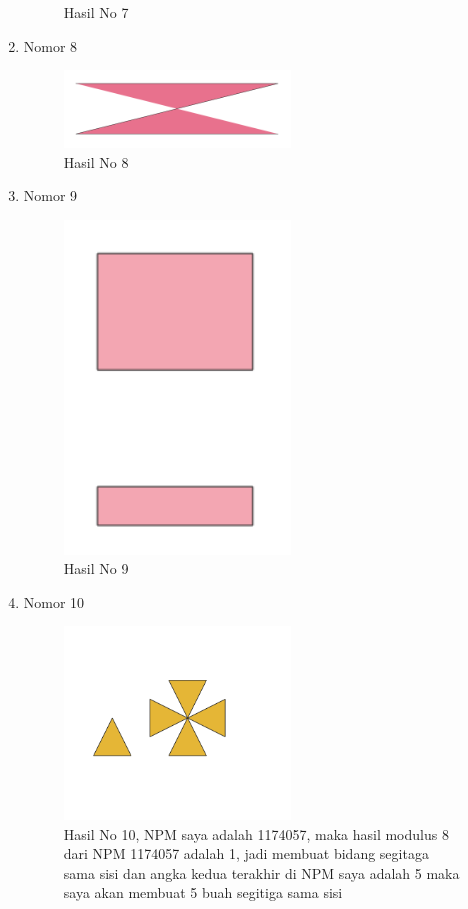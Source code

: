 \begin{enumerate}
\begin{figure}[H]
		\centering
		\caption{Hasil No 7}
	\end{figure}
	\item Nomor 8
	
	\begin{figure}[H]
		\includegraphics[width=6cm]{figures/1174057/alit8.PNG}
		\centering
		\caption{Hasil No 8}
	\end{figure}
	\item Nomor 9
	
	\begin{figure}[H]
		\includegraphics[width=6cm]{figures/1174057/alit9.PNG}
		\centering
		\caption{Hasil No 9}
	\end{figure}
	\item Nomor 10
	
	\begin{figure}[H]
		\includegraphics[width=6cm]{figures/1174057/soal10.PNG}
		\centering
		\caption{Hasil No 10, NPM saya adalah 1174057, maka hasil modulus 8 dari NPM 1174057 adalah 1, jadi membuat bidang segitaga sama sisi dan angka kedua terakhir di NPM saya adalah 5 maka saya akan membuat 5 buah segitiga sama sisi}
	\end{figure}
\end{enumerate}
